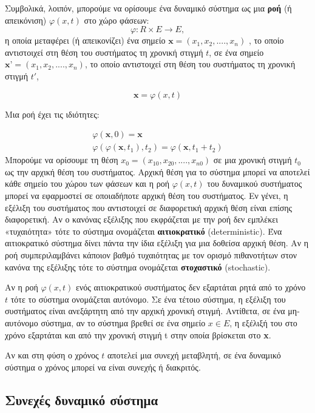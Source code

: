 \newpage

Συμβολικά, λοιπόν, μπορούμε να ορίσουμε ένα δυναμικό σύστημα ως μια \textbf{ροή} (ή απεικόνιση)  $φ(x,t)$  στο χώρο φάσεων:
\begin{equation}
 φ: R\times E \to E ,
\end{equation}
η οποία μεταφέρει (ή απεικονίζει) ένα σημείο $\textbf{x}=(x_1,x_2,....,x_n)$ , το οποίο αντιστοιχεί στη θέση του
συστήματος τη χρονική στιγμή $t$, σε ένα
σημείο $\textbf{x'}=(x_1,x_2,....,x_n)$, το οποίο αντιστοιχεί στη θέση του συστήματος τη χρονική στιγμή $t'$,

\begin{equation}
\textbf{x}=φ(x,t)
\end{equation}

Μια ροή έχει τις ιδιότητες:

\begin{gather}
φ(\textbf{x},0)=\textbf{x} \\
φ(φ(\textbf{x},t_1),t_2)=φ(\textbf{x},t_1+t_2)
\end{gather}
Μπορούμε να ορίσουμε τη θέση $x_0 = (x_10, x_20,...., x_{n0})$ σε μια χρονική στιγμή $t_0$ ως την αρχική θέση του
συστήματος. Αρχική θέση για το σύστημα μπορεί να αποτελεί κάθε σημείο του χώρου των φάσεων και η ροή $φ(x,t)$ του δυναμικού συστήματος μπορεί να εφαρμοστεί σε οποιαδήποτε αρχική θέση του συστήματος. Εν γένει, η εξέλιξη του συστήματος που αντιστοιχεί σε διαφορετική αρχική θέση είναι επίσης διαφορετική. Αν ο κανόνας εξέλιξης που εκφράζεται με την ροή δεν εμπλέκει «τυχαιότητα» τότε το σύστημα ονομάζεται \textbf{αιτιοκρατικό} (deterministic). Ένα αιτιοκρατικό σύστημα δίνει πάντα την ίδια εξέλιξη για μια δοθείσα αρχική θέση. Αν η ροή συμπεριλαμβάνει κάποιον βαθμό τυχαιότητας με τον ορισμό πιθανοτήτων στον κανόνα της εξέλιξης τότε το σύστημα ονομάζεται \textbf{στοχαστικό} (stochastic). 

Αν η ροή $φ(x,t)$ ενός αιτιοκρατικού συστήματος δεν εξαρτάται ρητά από το χρόνο $t$ τότε το σύστημα ονομάζεται αυτόνομο. Σε ένα τέτοιο σύστημα, η εξέλιξη του συστήματος είναι ανεξάρτητη από την αρχική
χρονική στιγμή. Αντίθετα, σε ένα μη-αυτόνομο σύστημα, αν το σύστημα βρεθεί σε ένα σημείο $x \in E$, η εξέλιξή του στο χρόνο εξαρτάται και από την χρονική στιγμή t στην οποία βρίσκεται στο \textbf{x}.

Αν και στη φύση ο χρόνος $t$ αποτελεί μια συνεχή μεταβλητή, σε ένα δυναμικό σύστημα ο χρόνος μπορεί να είναι συνεχής ή διακριτός.\cite{b2}



\subsection{Συνεχές δυναμικό σύστημα}
 
